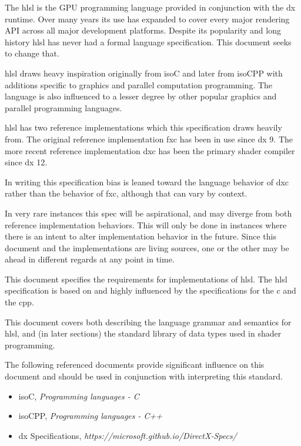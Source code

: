 
\p The \acrfull{hlsl} is the GPU programming language provided in conjunction
with the \gls{dx} runtime. Over many years its use has expanded to cover every
major rendering API across all major development platforms. Despite its
popularity and long history \acrshort{hlsl} has never had a formal language
specification. This document seeks to change that.

\p \acrshort{hlsl} draws heavy inspiration originally from \gls{isoC} and later
from \gls{isoCPP} with additions specific to graphics and parallel computation
programming. The language is also influenced to a lesser degree by other popular
graphics and parallel programming languages.

\p \acrshort{hlsl} has two reference implementations which this specification
draws heavily from. The original reference implementation \acrfull{fxc} has been
in use since \gls{dx} 9. The more recent reference implementation \acrfull{dxc}
has been the primary shader compiler since \gls{dx} 12.

\p In writing this specification bias is leaned toward the language
behavior of \acrshort{dxc} rather than the behavior of \acrshort{fxc}, although
that can vary by context.

\p In very rare instances this spec will be aspirational, and may diverge from
both reference implementation behaviors. This will only be done in instances
where there is an intent to alter implementation behavior in the future. Since
this document and the implementations are living sources, one or the other may
be ahead in different regards at any point in time.


\p This document specifies the requirements for implementations of
\acrshort{hlsl}. The \acrshort{hlsl} specification is based on and highly
influenced by the specifications for the \acrfull{c} and the \acrfull{cpp}.

\p This document covers both describing the language grammar and semantics for
\acrshort{hlsl}, and (in later sections) the standard library of data types used
in shader programming.


\p The following referenced documents provide significant influence on this
document and should be used in conjunction with interpreting this standard.

\begin{itemize}
  \item \gls{isoC}, \textit{Programming languages - C}
  \item \gls{isoCPP}, \textit{Programming languages - C++}
  \item \gls{dx} Specifications, \textit{https://microsoft.github.io/DirectX-Specs/}
\end{itemize}

